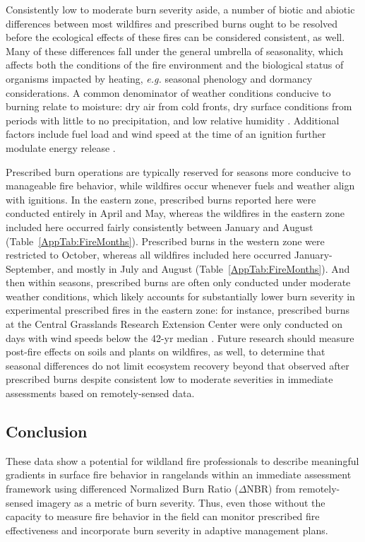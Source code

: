 \documentclass[fire,article,submit,oneauthor,pdftex]{Definitions/mdpi}
\begin{document}
Consistently low to moderate burn severity aside, a number of biotic and abiotic differences between most wildfires and prescribed burns ought to be resolved before the ecological effects of these fires can be considered consistent, as well. 
Many of these differences fall under the general umbrella of seasonality, which affects both the conditions of the fire environment and the biological status of organisms impacted by heating, \emph{e.g.} seasonal phenology and dormancy considerations. 
A common denominator of weather conditions conducive to burning relate to moisture: dry air from cold fronts, dry surface conditions from periods with little to no precipitation, and low relative humidity \cite{flannigan2001}. 
Additional factors include fuel load and wind speed at the time of an ignition further modulate energy release \cite{cheney1995, reid2010, kidnie2015, gomes2020}.

Prescribed burn operations are typically reserved for seasons more conducive to manageable fire behavior, while wildfires occur whenever fuels and weather align with ignitions. 
In the eastern zone, prescribed burns reported here were conducted entirely in April and May, whereas the wildfires in the eastern zone included here occurred fairly consistently between January and August (Table~\ref{AppTab:FireMonths}). 
Prescribed burns in the western zone were restricted to October, whereas all wildfires included here occurred January-September, and mostly in July and August (Table~\ref{AppTab:FireMonths}). 
And then within seasons, prescribed burns are often only conducted under moderate weather conditions, which likely accounts for substantially lower burn severity in experimental prescribed fires in the eastern zone: for instance, prescribed burns at the Central Grasslands Research Extension Center were only conducted on days with wind speeds below the 42-yr median \cite{mcgranahan2025}. 
Future research should measure post-fire effects on soils and plants on wildfires, as well, to determine that seasonal differences do not limit ecosystem recovery beyond that observed after prescribed burns despite consistent low to moderate severities in immediate assessments based on remotely-sensed data. 

\subsection{Conclusion}

These data show a potential for wildland fire professionals to describe meaningful gradients in surface fire behavior in rangelands within an immediate assessment framework using differenced Normalized Burn Ratio ($\Delta$NBR) from remotely-sensed imagery as a metric of burn severity. 
Thus, even those without the capacity to measure fire behavior in the field can monitor prescribed fire effectiveness and incorporate burn severity in adaptive management plans. 
\end{document}
